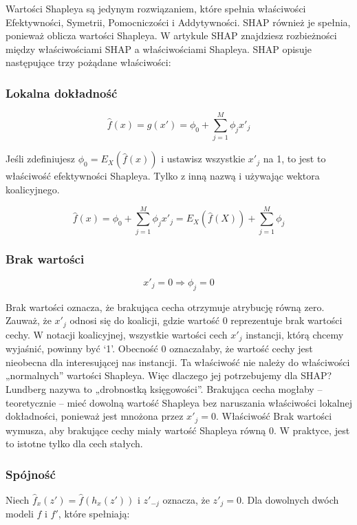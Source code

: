 Wartości Shapleya są jedynym rozwiązaniem, które spełnia właściwości Efektywności, Symetrii, Pomocniczości i Addytywności. SHAP również je spełnia, ponieważ oblicza wartości Shapleya. W artykule SHAP znajdziesz rozbieżności między właściwościami SHAP a właściwościami Shapleya. SHAP opisuje następujące trzy pożądane właściwości:

\subsubsection{Lokalna dokładność}

\[
\hat{f}(x) = g(x') = \phi_0 + \sum_{j=1}^M \phi_j x'_j
\]

Jeśli zdefiniujesz $\phi_0 = E_X(\hat{f}(x))$ i ustawisz wszystkie $x'_j$ na 1, to jest to właściwość efektywności Shapleya. Tylko z inną nazwą i używając wektora koalicyjnego.

\[
\hat{f}(x) = \phi_0 + \sum_{j=1}^M \phi_j x'_j = E_X(\hat{f}(X)) + \sum_{j=1}^M \phi_j
\]

\subsubsection{Brak wartości}

\[
x'_j = 0 \Rightarrow \phi_j = 0
\]

Brak wartości oznacza, że brakująca cecha otrzymuje atrybucję równą zero. Zauważ, że $x'_j$ odnosi się do koalicji, gdzie wartość 0 reprezentuje brak wartości cechy. W notacji koalicyjnej, wszystkie wartości cech $x'_j$ instancji, którą chcemy wyjaśnić, powinny być ‘1’. Obecność 0 oznaczałaby, że wartość cechy jest nieobecna dla interesującej nas instancji. Ta właściwość nie należy do właściwości „normalnych” wartości Shapleya. Więc dlaczego jej potrzebujemy dla SHAP? Lundberg nazywa to „drobnostką księgowości”. Brakująca cecha mogłaby – teoretycznie – mieć dowolną wartość Shapleya bez naruszania właściwości lokalnej dokładności, ponieważ jest mnożona przez $x'_j = 0$. Właściwość Brak wartości wymusza, aby brakujące cechy miały wartość Shapleya równą 0. W praktyce, jest to istotne tylko dla cech stałych.

\subsubsection{Spójność}

Niech $\hat{f}_x(z') = \hat{f}(h_x(z'))$ i $z'_{-j}$ oznacza, że $z'_j = 0$. Dla dowolnych dwóch modeli $f$ i $f'$, które spełniają:

